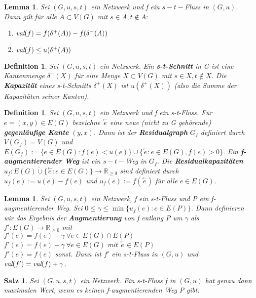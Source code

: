 \documentclass[12pt,a4paper]{article}
\theoremstyle{plain}
\newtheorem{Satz}[Theorem]{Satz}
\newtheorem{Lemma}[Theorem]{Lemma}
\newtheorem{Definition}[Theorem]{Definition}
\newcommand{\herv}[1]{{\emph{\textbf{#1}}}}
\newcommand{\R}{\mathbb{R}}
\newcommand{\cupdot}{\mathbin{\dot{\cup}}}
\numberwithin{equation}{section}
\begin{document}
\begin{Lemma}
Sei $(G,u,s,t)$ ein Netzwerk und f ein $s-t-$Fluss in $(G,u)$. Dann gilt für alle $A\subset V(G)$ mit $s\in A, t\not\in A:$
\begin{enumerate}
\renewcommand{\labelenumi}{\emph{(\alph{enumi})}}
\item $\emph{val}(f) = f(\delta^+(A))-f(\delta^-(A))$
\item $\emph{val}(f)\leq u(\delta^+(A))$
\end{enumerate}
\end{Lemma}
\begin{Definition}
Sei $(G,u,s,t)$ ein Netzwerk. Ein \herv{s-t-Schnitt} in G ist eine Kantenmenge $\delta^+(X)$ für eine Menge $X\subset V(G)$ mit $s\in X, t\not\in X$. Die \herv{Kapazität} eines s-t-Schnitts $\delta^+(X)$ ist $u(\delta^ +(X))$ (also die Summe der Kapazitäten seiner Kanten).
\end{Definition}
\begin{Definition}
Sei $(G,u,s,t)$ ein Netzwerk und f ein s-t-Fluss. Für $e=(x,y)\in E(G)$ bezeichne $\stackrel{\leftarrow}{e}$ eine neue (nicht zu G gehörende) \herv{gegenläufige Kante} $(y,x)$. Dann ist der \herv{Residualgraph} $G_f$ definiert durch $V(G_f)=V(G)$ und $E(G_f):=\{e\in E(G):f(e)<u(e)\} \cupdot \{\stackrel{\leftarrow}{e}:e\in E(G), f(e)>0\}$. Ein \textbf{f-}\herv{augmentierender Weg} ist ein $s-t-$Weg in $G_f$. Die \herv{Residualkapazitäten} $u_f:E(G)\cupdot \{\stackrel{\leftarrow}{e} :e\in E(G)\}\rightarrow \R_{\geq 0}$ sind definiert durch $u_f(e):=u(e)-f(e)$ und $u_f(e):=f(\stackrel{\leftarrow}{e})$ für alle $e\in E(G)$.
\end{Definition}
\begin{Lemma}
Sei $(G,u,s,t)$ ein Netzwerk, f ein s-t-Fluss und P ein f-augmentierender Weg. Sei $0\leq\gamma\leq\min\{u_f(e):e\in E(P)\}$. Dann definieren wir das Ergebnis der \herv{Augmentierung} von f entlang P um $\gamma$ als $f':E(G)\rightarrow \R_{\geq 0}$ mit \\$f'(e)=f(e)+\gamma\ \forall e\in E(G) \cap E(P)$\\
$f'(e)=f(e)-\gamma\ \forall e\in E(G)$ mit $\stackrel{\leftarrow}{e}\in E(P)$\\
$f'(e)=f(e)$ sonst. Dann ist $f'$ ein s-t-Fluss in $(G,u)$ und $\emph{val}(f')=\emph{val}(f)+\gamma$.
\end{Lemma}
\begin{Satz}
Sei $(G,u,s,t)$ ein Netzwerk. Ein s-t-Fluss f in $(G,u)$ hat genau dann maximalen Wert, wenn es keinen f-augmentierenden Weg P gibt.
\end{Satz}
\end{document}
